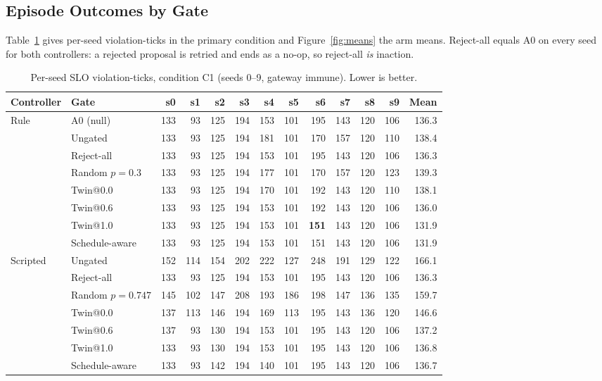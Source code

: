 \documentclass[conference]{IEEEtran}
\begin{document}
\subsection{Episode Outcomes by Gate}

Table~\ref{tab:perseed} gives per-seed violation-ticks in the primary condition and Figure~\ref{fig:means} the arm means. Reject-all equals A0 on every seed for both controllers: a rejected proposal is retried and ends as a no-op, so reject-all \emph{is} inaction.

\begin{table}[t]
\centering
\caption{Per-seed SLO violation-ticks, condition C1 (seeds 0--9, gateway immune). Lower is better.}
\label{tab:perseed}
\small
\setlength{\tabcolsep}{4.2pt}
\begin{tabular}{@{}llrrrrrrrrrrr@{}}
\toprule
Controller & Gate & s0 & s1 & s2 & s3 & s4 & s5 & s6 & s7 & s8 & s9 & Mean \\
\midrule
\multirow{8}{*}{Rule}
 & A0 (null)        & 133 & 93 & 125 & 194 & 153 & 101 & 195 & 143 & 120 & 106 & 136.3 \\
 & Ungated          & 133 & 93 & 125 & 194 & 181 & 101 & 170 & 157 & 120 & 110 & 138.4 \\
 & Reject-all       & 133 & 93 & 125 & 194 & 153 & 101 & 195 & 143 & 120 & 106 & 136.3 \\
 & Random $p{=}0.3$ & 133 & 93 & 125 & 194 & 177 & 101 & 170 & 157 & 120 & 123 & 139.3 \\
 & Twin@0.0         & 133 & 93 & 125 & 194 & 170 & 101 & 192 & 143 & 120 & 110 & 138.1 \\
 & Twin@0.6         & 133 & 93 & 125 & 194 & 153 & 101 & 192 & 143 & 120 & 106 & 136.0 \\
 & Twin@1.0         & 133 & 93 & 125 & 194 & 153 & 101 & \textbf{151} & 143 & 120 & 106 & 131.9 \\
 & Schedule-aware   & 133 & 93 & 125 & 194 & 153 & 101 & 151 & 143 & 120 & 106 & 131.9 \\
\midrule
\multirow{6}{*}{Scripted}
 & Ungated            & 152 & 114 & 154 & 202 & 222 & 127 & 248 & 191 & 129 & 122 & 166.1 \\
 & Reject-all         & 133 & 93 & 125 & 194 & 153 & 101 & 195 & 143 & 120 & 106 & 136.3 \\
 & Random $p{=}0.747$ & 145 & 102 & 147 & 208 & 193 & 186 & 198 & 147 & 136 & 135 & 159.7 \\
 & Twin@0.0           & 137 & 113 & 146 & 194 & 169 & 113 & 195 & 143 & 136 & 120 & 146.6 \\
 & Twin@0.6           & 137 & 93 & 130 & 194 & 153 & 101 & 195 & 143 & 120 & 106 & 137.2 \\
 & Twin@1.0           & 133 & 93 & 130 & 194 & 153 & 101 & 195 & 143 & 120 & 106 & 136.8 \\
 & Schedule-aware     & 133 & 93 & 142 & 194 & 140 & 101 & 195 & 143 & 120 & 106 & 136.7 \\
\bottomrule
\end{tabular}
\end{table}
\end{document}
